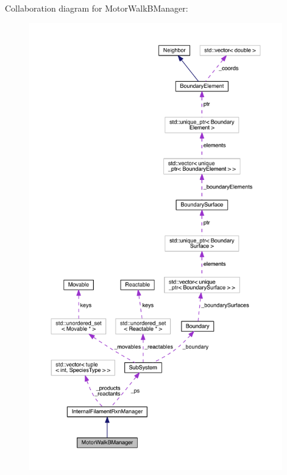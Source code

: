 Collaboration diagram for Motor\+Walk\+B\+Manager\+:
\nopagebreak
\begin{figure}[H]
\begin{center}
\leavevmode
\includegraphics[height=550pt]{classMotorWalkBManager__coll__graph}
\end{center}
\end{figure}
